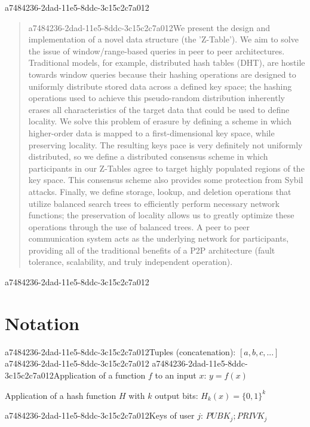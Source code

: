 \documentclass[12pt]{article}
\begin{document}
a7484236-2dad-11e5-8ddc-3c15c2c7a012\maketitle

\begin{abstract}
a7484236-2dad-11e5-8ddc-3c15c2c7a012We present the design and implementation of a novel data structure (the 'Z-Table'). We aim to solve the issue of window/range-based queries in peer to peer architectures. Traditional models, for example,  distributed hash tables (DHT), are hostile towards window queries because their hashing operations are designed to uniformly distribute stored data across a defined key space; the hashing operations used to achieve this pseudo-random distribution inherently erases all characteristics of the target data that could be used to define locality. We solve this problem of erasure by defining a scheme in which higher-order data is mapped to a first-dimensional key space, while preserving locality. The resulting keys pace is very definitely not uniformly distributed, so we define a distributed consensus scheme in which participants in our Z-Tables agree to target highly populated regions of the key space. This consensus scheme also provides some protection from Sybil attacks. Finally, we define storage, lookup, and deletion operations that utilize balanced search trees to efficiently perform necessary network functions; the preservation of locality allows us to greatly optimize these operations through the use of balanced trees. A peer to peer communication system acts as the underlying network for participants, providing all of the traditional benefits of a P2P architecture (fault tolerance, scalability, and truly independent operation).
\end{abstract}

a7484236-2dad-11e5-8ddc-3c15c2c7a012\section{Notation}

a7484236-2dad-11e5-8ddc-3c15c2c7a012Tuples (concatenation): $[a,b,c,...]$
a7484236-2dad-11e5-8ddc-3c15c2c7a012
a7484236-2dad-11e5-8ddc-3c15c2c7a012Application of a function $f$ to an input $x$: $y=f(x)$

Application of a hash function $H$ with $k$ output bits: $H_{k}(x) = \{0,1\}^k$

a7484236-2dad-11e5-8ddc-3c15c2c7a012Keys of user $j$: $ PUBK_j; PRIVK_j $
\end{document}

